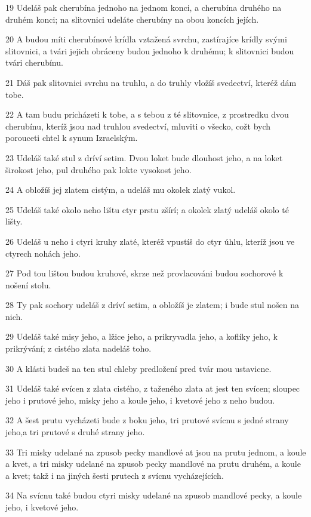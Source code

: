 \par 19 Udeláš pak cherubína jednoho na jednom konci, a cherubína druhého na druhém konci; na slitovnici udeláte cherubíny na obou koncích jejích.
\par 20 A budou míti cherubínové krídla vztažená svrchu, zastírajíce krídly svými slitovnici, a tvári jejich obráceny budou jednoho k druhému; k slitovnici budou tvári cherubínu.
\par 21 Dáš pak slitovnici svrchu na truhlu, a do truhly vložíš svedectví, kteréž dám tobe.
\par 22 A tam budu pricházeti k tobe, a s tebou z té slitovnice, z prostredku dvou cherubínu, kteríž jsou nad truhlou svedectví, mluviti o všecko, cožt bych porouceti chtel k synum Izraelským.
\par 23 Udeláš také stul z dríví setim. Dvou loket bude dlouhost jeho, a na loket širokost jeho, pul druhého pak lokte vysokost jeho.
\par 24 A obložíš jej zlatem cistým, a udeláš mu okolek zlatý vukol.
\par 25 Udeláš také okolo neho lištu ctyr prstu zšírí; a okolek zlatý udeláš okolo té lišty.
\par 26 Udeláš u neho i ctyri kruhy zlaté, kteréž vpustíš do ctyr úhlu, kteríž jsou ve ctyrech nohách jeho.
\par 27 Pod tou lištou budou kruhové, skrze než provlacováni budou sochorové k nošení stolu.
\par 28 Ty pak sochory udeláš z dríví setim, a obložíš je zlatem; i bude stul nošen na nich.
\par 29 Udeláš také misy jeho, a lžice jeho, a prikryvadla jeho, a koflíky jeho, k prikrývání; z cistého zlata nadeláš toho.
\par 30 A klásti budeš na ten stul chleby predložení pred tvár mou ustavicne.
\par 31 Udeláš také svícen z zlata cistého, z taženého zlata at jest ten svícen; sloupec jeho i prutové jeho, misky jeho a koule jeho, i kvetové jeho z neho budou.
\par 32 A šest prutu vycházeti bude z boku jeho, tri prutové svícnu s jedné strany jeho,a tri prutové s druhé strany jeho.
\par 33 Tri misky udelané na zpusob pecky mandlové at jsou na prutu jednom, a koule a kvet, a tri misky udelané na zpusob pecky mandlové na prutu druhém, a koule a kvet; takž i na jiných šesti prutech z svícnu vycházejících.
\par 34 Na svícnu také budou ctyri misky udelané na zpusob mandlové pecky, a koule jeho, i kvetové jeho.
